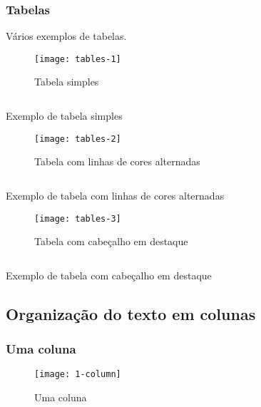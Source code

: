 \subsubsection{Tabelas}

Vários exemplos de tabelas.

\begin{figure}[!ht]
    \centering
    \texttt{[image: tables-1]}
    \caption{Tabela simples}\label{RS0001:fig:tables-1}
\end{figure}

\begin{code}
    \inputminted[label=tables-1.html]{html}{../RS0001/anexos/tables-1.html}
    \caption{Exemplo de tabela simples}\label{RS0001:code:exemplo-tables}
\end{code}

\begin{figure}[!ht]
    \centering
    \texttt{[image: tables-2]}
    \caption{Tabela com linhas de cores alternadas}\label{RS0001:fig:tables-2}
\end{figure}

\begin{code}
    \inputminted[label=tables-2.html]{html}{../RS0001/anexos/tables-2.html}
    \caption{Exemplo de tabela com linhas de cores alternadas}\label{RS0001:code:exemplo-tables-2}
\end{code}

\begin{figure}[!ht]
    \centering
    \texttt{[image: tables-3]}
    \caption{Tabela com cabeçalho em destaque}\label{RS0001:fig:tables-3}
\end{figure}

\begin{code}
    \inputminted[label=tables-3.html]{html}{../RS0001/anexos/tables-3.html}
    \caption{Exemplo de tabela com cabeçalho em destaque}\label{RS0001:code:exemplo-tables-3}
\end{code}


\subsection{Organização do texto em colunas}

\subsubsection{Uma coluna}

\begin{figure}[!ht]
    \centering
    \texttt{[image: 1-column]}
    \caption{Uma coluna}\label{RS0001:fig:1-column}
\end{figure}

